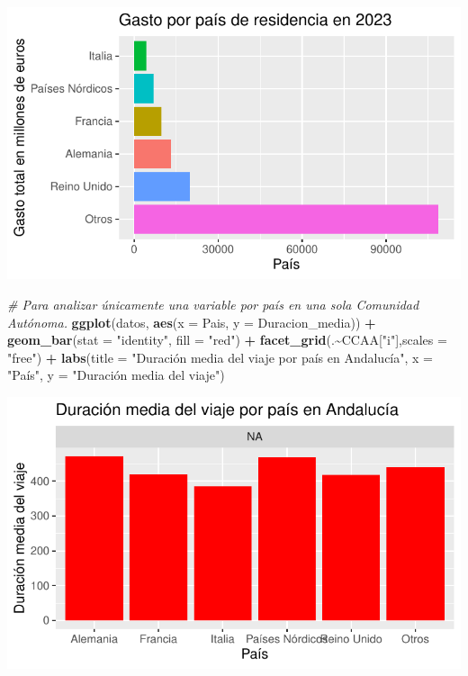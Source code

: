 \documentclass[data,article,submit,moreauthors,pdftex]{Definitions/mdpi}
\newenvironment{Shaded}{\begin{snugshade}}{\end{snugshade}}
\newcommand{\AttributeTok}[1]{\textcolor[rgb]{0.13,0.29,0.53}{#1}}
\newcommand{\CommentTok}[1]{\textcolor[rgb]{0.56,0.35,0.01}{\textit{#1}}}
\newcommand{\FunctionTok}[1]{\textcolor[rgb]{0.13,0.29,0.53}{\textbf{#1}}}
\newcommand{\NormalTok}[1]{#1}
\newcommand{\SpecialCharTok}[1]{\textcolor[rgb]{0.81,0.36,0.00}{\textbf{#1}}}
\newcommand{\StringTok}[1]{\textcolor[rgb]{0.31,0.60,0.02}{#1}}
\begin{document}
\includegraphics{ProyectoAED2024_Rmd_files/figure-latex/unnamed-chunk-21-2.pdf}

\begin{Shaded}
\begin{Highlighting}[]
\CommentTok{\# Para analizar únicamente una variable por país en una sola Comunidad Autónoma.}
\FunctionTok{ggplot}\NormalTok{(datos, }\FunctionTok{aes}\NormalTok{(}\AttributeTok{x =}\NormalTok{ Pais, }\AttributeTok{y =}\NormalTok{ Duracion\_media)) }\SpecialCharTok{+} 
  \FunctionTok{geom\_bar}\NormalTok{(}\AttributeTok{stat =} \StringTok{"identity"}\NormalTok{, }\AttributeTok{fill =} \StringTok{"red"}\NormalTok{) }\SpecialCharTok{+}
  \FunctionTok{facet\_grid}\NormalTok{(.}\SpecialCharTok{\textasciitilde{}}\NormalTok{CCAA[}\StringTok{"i"}\NormalTok{],}\AttributeTok{scales =} \StringTok{"free"}\NormalTok{) }\SpecialCharTok{+}
  \FunctionTok{labs}\NormalTok{(}\AttributeTok{title =} \StringTok{"Duración media del viaje por país en Andalucía"}\NormalTok{, }\AttributeTok{x =} \StringTok{"País"}\NormalTok{, }\AttributeTok{y =} \StringTok{"Duración media del viaje"}\NormalTok{)}
\end{Highlighting}
\end{Shaded}

\includegraphics{ProyectoAED2024_Rmd_files/figure-latex/unnamed-chunk-21-3.pdf}
\end{document}
